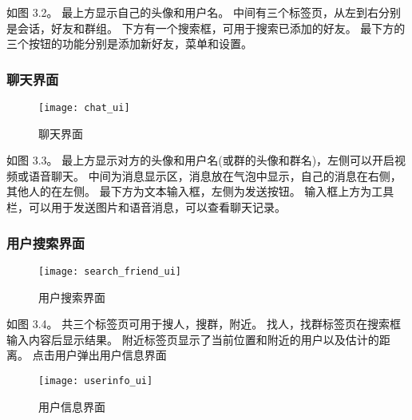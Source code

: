 如图 3.2。
最上方显示自己的头像和用户名。
中间有三个标签页，从左到右分别是会话，好友和群组。
下方有一个搜索框，可用于搜索已添加的好友。
最下方的三个按钮的功能分别是添加新好友，菜单和设置。

\clearpage
\subsubsection{聊天界面}
\begin{figure}[h]
	\centering
	\texttt{[image: chat\_ui]}
	\caption{聊天界面} \label{fig:chat_ui}
\end{figure}


如图 3.3。
最上方显示对方的头像和用户名(或群的头像和群名)，左侧可以开启视频或语音聊天。
中间为消息显示区，消息放在气泡中显示，自己的消息在右侧，其他人的在左侧。
最下方为文本输入框，左侧为发送按钮。
输入框上方为工具栏，可以用于发送图片和语音消息，可以查看聊天记录。

\subsubsection{用户搜索界面}
\begin{figure}[h]
	\centering
	\texttt{[image: search\_friend\_ui]}
	\caption{用户搜索界面} \label{fig:search_friend_ui}
\end{figure}

如图 3.4。
共三个标签页可用于搜人，搜群，附近。
找人，找群标签页在搜索框输入内容后显示结果。
附近标签页显示了当前位置和附近的用户以及估计的距离。
点击用户弹出用户信息界面

\begin{figure}[ht]
	\centering
	\texttt{[image: userinfo\_ui]}
	\caption{用户信息界面} \label{fig:userinfo_ui}
\end{figure}


